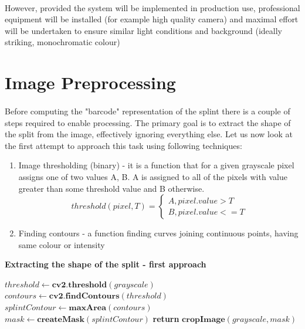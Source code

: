  
\paragraph{}
However, provided the system will be implemented in production use, professional equipment will be installed (for example high quality camera) and maximal effort will be undertaken to ensure similar light conditions and background (ideally striking, monochromatic colour)

\section{Image Preprocessing}
\paragraph{}
Before computing the "barcode" representation of the splint there is a couple of steps required to enable processing. The primary goal is to extract the shape of the split from the image, effectively ignoring everything else. Let us now look at the first attempt to approach this task using following techniques:

\begin{enumerate}
	\item Image thresholding (binary) - it is a function that for a given grayscale pixel assigns one of two values {A, B}. A is assigned to all of the pixels with value greater than some threshold value and B otherwise.
	$$
	threshold (pixel, T) = \begin{cases}
		A, pixel.value > T \\
		B, pixel.value <= T
	\end{cases}
	$$
	\item Finding contours - a function finding curves joining continuous points, having same colour or intensity
\end{enumerate}

\begin{algorithm}{\textbf{Extracting the shape of the split - first approach}}
	\begin{algorithmic}[1]
			\State $threshold \gets \textbf{cv2.threshold}(grayscale)$
			\State $contours \gets \textbf{cv2.findContours}(threshold)$
			\State $splintContour \gets \textbf{maxArea}(contours)$
			\State $mask \gets \textbf{createMask}(splintContour)$
			\State \textbf{return} $\textbf{cropImage}(grayscale, mask)$
		\EndFunction
	\end{algorithmic}	
\end{algorithm}

